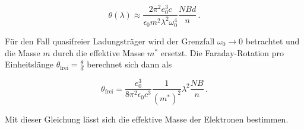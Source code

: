 \begin{equation*}
    \theta(\lambda)\approx \frac{2 \pi^2 e_0^3 c}{\epsilon_0 m^2 \lambda^2 \omega_0^4}\frac{NBd}{n}\,.
\end{equation*}

Für den Fall quasifreier Ladungsträger wird der Grenzfall $\omega_0 \rightarrow 0$ betrachtet und die Masse $m$ durch die effektive Masse $m^*$
ersetzt. Die Faraday-Rotation pro Einheitslänge $\theta_\text{frei} = \frac{\theta}{d}$ berechnet sich dann als 

\begin{equation}
    \label{eqn:mass}
    \theta_\text{frei} = \frac{e_0^3}{8\pi^2\epsilon_0 c^3} \frac{1}{(m^*)^2}\lambda^2\frac{NB}{n}\,.
\end{equation}

Mit dieser Gleichung lässt sich die effektive Masse der Elektronen bestimmen. 